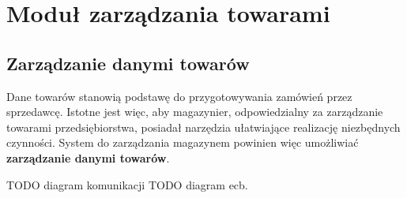\section{Moduł zarządzania towarami}
% 
\singlespacing
\subsection{Zarządzanie danymi towarów}

Dane towarów stanowią podstawę do przygotowywania zamówień przez
sprzedawcę. Istotne jest więc, aby magazynier, odpowiedzialny za
zarządzanie towarami przedsiębiorstwa, posiadał narzędzia 
ułatwiające realizację niezbędnych czynności. System
do zarządzania magazynem powinien więc umożliwiać \textbf{zarządzanie
danymi towarów}.
\begin{usecase}
\end{usecase}
TODO diagram komunikacji
TODO diagram ecb.

